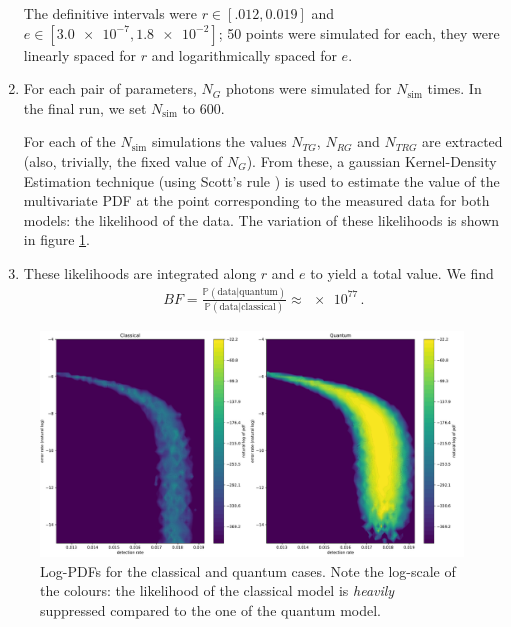 \documentclass[main.tex]{subfiles}
\begin{document}
\begin{enumerate}
    The definitive intervals were \(r \in [\num{.012}, \num{0.019}]\) and \(e \in [\num{3.0e-7}, \num{1.8e-2}]\); 50 points were simulated for each, they were linearly spaced for \(r\) and logarithmically spaced for \(e\). 
    \item For each pair of parameters, \(N_G\) photons were simulated for \(N _{\text{sim}}\) times. In the final run, we set \(N _{\text{sim}}\) to 600. 
    
    For each of the \(N _{\text{sim}}\) simulations the values \(N_{TG}\), \(N_{RG}\) and \(N_{TRG}\) are extracted (also, trivially, the fixed value of \(N_G\)). 
    From these, a gaussian Kernel-Density Estimation technique (using Scott's rule \cite[]{scipycontributorsScipyStatsGaussian2019,scottMultivariateDensityEstimation2015}) is used to estimate the value of the multivariate PDF at the point corresponding to the measured data for both models: the likelihood of the data.
    The variation of these likelihoods is shown in figure \ref{fig:both_logpdfs}. 
    \item These likelihoods are integrated along \(r\) and \(e\) to yield a total value. We find 
    \begin{align}
    BF = \frac{\mathbb{P}(\text{data} | \text{quantum})}{\mathbb{P}(\text{data} | \text{classical})}
    \approx \num{e77}
    \,.
    \end{align}
\end{enumerate}

\begin{figure}[ht]
\centering
\includegraphics[width=\textwidth]{figures/both_logpdfs}
\caption{Log-PDFs for the classical and quantum cases. Note the log-scale of the colours: the likelihood of the classical model is \emph{heavily} suppressed compared to the one of the quantum model.}
\label{fig:both_logpdfs}
\end{figure}
\end{document}
